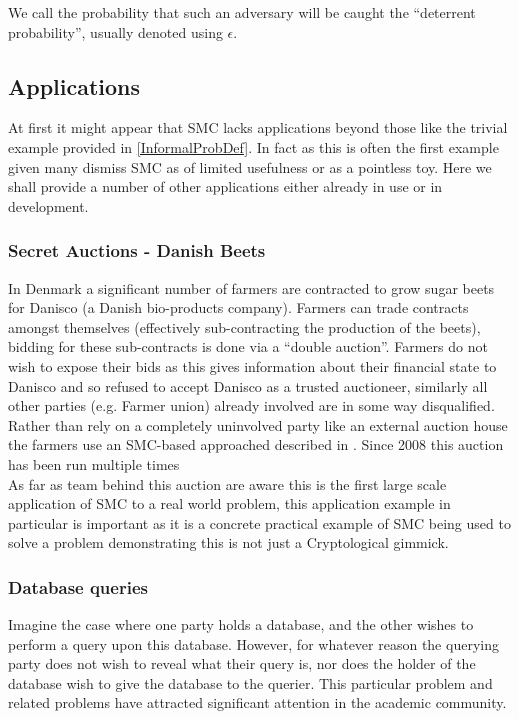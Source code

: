 \documentclass[a4paper,10pt]{article}
\begin{document}
		We call the probability that such an adversary will be caught the ``deterrent probability'', usually denoted using $\epsilon$.


    \subsection{Applications} \label{Applications}
      At first it might appear that SMC lacks applications beyond those like the trivial example provided in \ref{InformalProbDef}. In fact as this is often the first example given many dismiss SMC as of limited usefulness or as a pointless toy. Here we shall provide a number of other applications either already in use or in development.


      \subsubsection{Secret Auctions - Danish Beets} \label{BeetsAuctionApplication}
		In Denmark a significant number of farmers are contracted to grow sugar beets for Danisco (a Danish bio-products company). Farmers can trade contracts amongst themselves (effectively sub-contracting the production of the beets), bidding for these sub-contracts is done via a ``double auction''. Farmers do not wish to expose their bids as this gives information about their financial state to Danisco and so refused to accept Danisco as a trusted auctioneer, similarly all other parties (e.g. Farmer union) already involved are in some way disqualified. Rather than rely on a completely uninvolved party like an external auction house the farmers use an SMC-based approached described in \cite{SugarBeets}. Since 2008 this auction has been run multiple times \\

		As far as team behind this auction are aware this is the first large scale application of SMC to a real world problem, this application example in particular is important as it is a concrete practical example of SMC being used to solve a problem demonstrating this is not just a Cryptological gimmick.

      \subsubsection{Database queries} \label{LegalDatabaseApplication}
		Imagine the case where one party holds a database, and the other wishes to perform a query upon this database. However, for whatever reason the querying party does not wish to reveal what their query is, nor does the holder of the database wish to give the database to the querier. This particular problem and related problems have attracted significant attention in the academic community.
\end{document}
